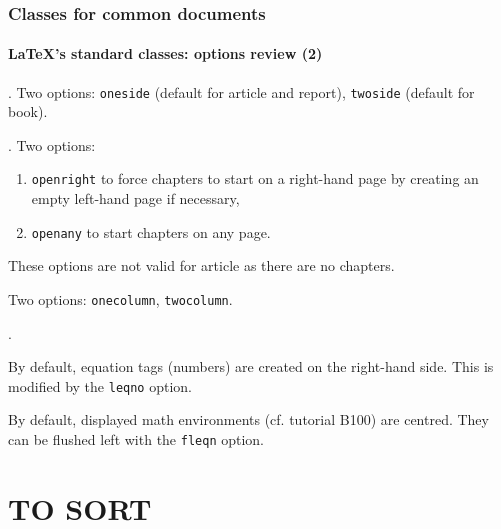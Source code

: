 \documentclass[11pt]{beamer}
\begin{document}
\begin{frame}
	\frametitle{Classes for common documents}
	\framesubtitle{\LaTeX{}'s standard classes: options review (2)}
	
	
	.
	Two options: \texttt{oneside} (default for article and report), \texttt{twoside} (default for book).
	
	
	.
	Two options:
	\begin{enumerate}
		\item \texttt{openright} to force chapters to start on a right-hand page by creating an empty left-hand page if necessary,
		\item \texttt{openany} to start chapters on any page.
	\end{enumerate}
	These options are not valid for article as there are no chapters.
	
	
	\vspace*{1ex}
	
	
	Two options: \texttt{onecolumn}, \texttt{twocolumn}.
	
	
	\vspace*{1ex}
	
	
	.
	
	By default, equation tags (numbers) are created on the right-hand side.
	This is modified by the \texttt{leqno} option.
	
	By default, displayed math environments (cf. tutorial B100) are centred.
	They can be flushed left with the \texttt{fleqn} option.
\end{frame}




\section{TO SORT}
\end{document}
